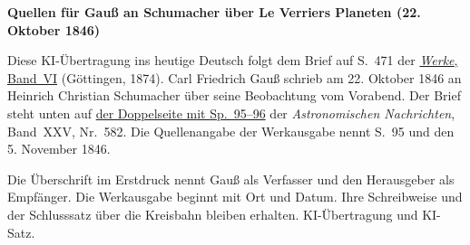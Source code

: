 \clearpage\thispagestyle{empty}
\begin{center}\textbf{Quellen für Gauß an Schumacher über Le Verriers Planeten (22. Oktober 1846)}\end{center}
\noindent Diese KI-Übertragung ins heutige Deutsch folgt dem Brief auf S.~471 der \href{https://gdz.sub.uni-goettingen.de/id/PPN236007467}{\textit{Werke}, Band~VI} (Göttingen, 1874). Carl Friedrich Gauß schrieb am 22. Oktober 1846 an Heinrich Christian Schumacher über seine Beobachtung vom Vorabend. Der Brief steht unten auf \href{https://api.digitale-sammlungen.de/iiif/image/v2/bsb10049450_00056/full/1800,/0/default.jpg}{der Doppelseite mit Sp.~95--96} der \textit{Astronomischen Nachrichten}, Band~XXV, Nr.~582. Die Quellenangabe der Werkausgabe nennt S.~95 und den 5. November 1846.
\par\smallskip\noindent Die Überschrift im Erstdruck nennt Gauß als Verfasser und den Herausgeber als Empfänger. Die Werkausgabe beginnt mit Ort und Datum. Ihre Schreibweise und der Schlusssatz über die Kreisbahn bleiben erhalten. KI-Übertragung und KI-Satz.
\clearpage
